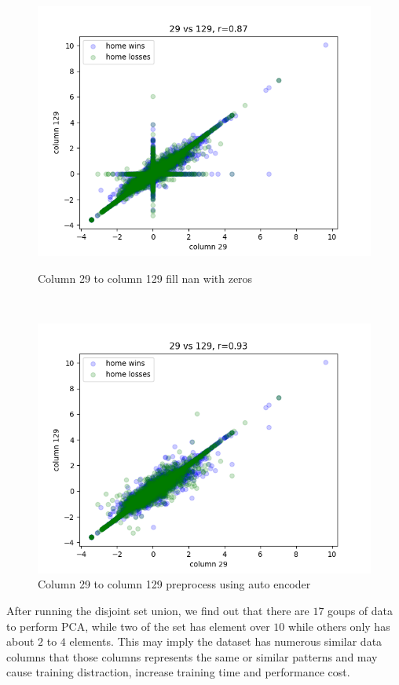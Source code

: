 \documentclass[12pt,a4paper]{article}
\begin{document}
\begin{figure}[ht]
    \begin{minipage}{.4\textwidth}
        \centering
        \includegraphics[width=0.8\linewidth]{images/0.87r_29_to_129.png}
        \caption[width=0.8\linewidth]{Column 29 to column 129 fill nan with zeros}
        \label{fig:29-129}
    \end{minipage}%
    \begin{minipage}{.1\textwidth}
        \ 
    \end{minipage}%
    \begin{minipage}{.4\textwidth}
        \centering
        \includegraphics[width=0.8\linewidth]{images/0.93r_29_to_129_recovered.png}
        \caption[width=0.8\linewidth]{Column 29 to column 129 preprocess using auto encoder}
        \label{fig:29-129r}
    \end{minipage}
\end{figure}

After running the disjoint set union, we find out that there are $17$ goups of data to perform PCA, while two of the set has element over $10$ while others only has about $2$ to $4$ elements.
This may imply the dataset has numerous similar data columns that those columns represents the same or similar patterns and may cause training distraction, increase training time and performance cost.
\end{document}
